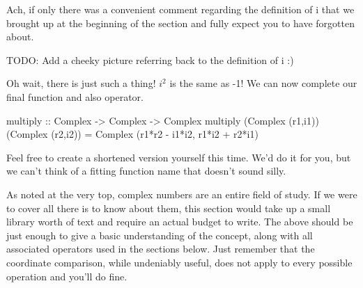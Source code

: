 Ach, if only there was a convenient comment regarding the definition of i that we brought up at the beginning of the section and fully expect you to have forgotten about.

TODO: Add a cheeky picture referring back to the definition of i :)

Oh wait, there is just such a thing! $i^2$ is the same as -1! We can now complete our final function and also operator.

\begin{code}
multiply :: Complex -> Complex -> Complex
multiply (Complex (r1,i1)) (Complex (r2,i2))
  = Complex (r1*r2 - i1*i2, r1*i2 + r2*i1)
\end{code}
Feel free to create a shortened version yourself this time. We'd do it for you, but we can't think of a fitting function name that doesn't sound silly.

\vspace{1cm}

As noted at the very top, complex numbers are an entire field of study. If we were to cover all there is to know about them, this section would take up a small library worth of text and require an actual budget to write. The above should be just enough to give a basic understanding of the concept, along with all associated operators used in the sections below. Just remember that the coordinate comparison, while undeniably useful, does not apply to every possible operation and you'll do fine.


\iffalse %
\begin{code}
data Complex = Complex (Double, Double)
  deriving (Show)
  
test1 = Complex (1,1)
test2 = Complex (3,4)

whatsReal :: Complex -> Double
whatsReal (Complex (x, y)) = x

whatsImaginary :: Complex -> Double
whatsImaginary (Complex (x, y)) = y

add :: Complex -> Complex -> Complex
add (Complex (r1,i1)) (Complex (r2,i2)) = (Complex (r1+r2,i1+i2))

sub :: Complex -> Complex -> Complex
sub (Complex (r1,i1)) (Complex (r2,i2)) = Complex (r1-r2,i1-i2)

absolute :: Complex -> Double
absolute (Complex (real,imaginary)) = sqrt (real^2 + imaginary^2)

argument :: Complex -> Double
argument (Complex (real,imaginary))
  | imaginary >= 0  = atan (imaginary/real)
  | otherwise       = -atan (-imaginary/real)
  
multiply :: Complex -> Complex -> Complex
multiply (Complex (r1,i1)) (Complex (r2,i2))
  = Complex (r1*r2 - i1*i2, r1*i2 + r2*i1)

\end{code}
\fi